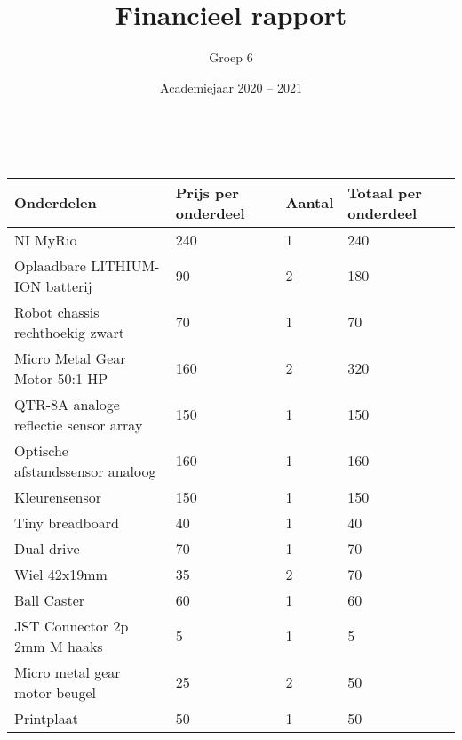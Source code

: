 \documentclass[a4paper,kulak]{kulakarticle} %
\date{Academiejaar 2020 -- 2021}
\title{Financieel rapport}
\author{Groep 6}
\begin{document}

\maketitle


~\\

	\begin{tabular}{|l|l|l|l|}
		\hline
		\textbf{Onderdelen}                   & \textbf{Prijs per onderdeel} & \textbf{Aantal} & \textbf{Totaal per onderdeel} \\ \hline
		NI MyRio                              & 240                          & 1               & 240                           \\ \hline
		Oplaadbare LITHIUM-ION batterij       & 90                           & 2               & 180                           \\ \hline
		Robot chassis rechthoekig zwart       & 70                           & 1               & 70                            \\ \hline
		Micro Metal Gear Motor 50:1 HP        & 160                          & 2               & 320                           \\ \hline
		QTR-8A analoge reflectie sensor array & 150                          & 1               & 150                           \\ \hline
		Optische afstandssensor analoog       & 160                          & 1               & 160                           \\ \hline
		Kleurensensor                         & 150                          & 1               & 150                           \\ \hline
		Tiny breadboard                       & 40                           & 1               & 40                            \\ \hline
		Dual drive                            & 70                           & 1               & 70                            \\ \hline
		Wiel 42x19mm                          & 35                           & 2               & 70                            \\ \hline
		Ball Caster                           & 60                           & 1               & 60                            \\ \hline
		JST Connector 2p 2mm M haaks          & 5                            & 1               & 5                             \\ \hline
		Micro metal gear motor beugel         & 25                           & 2               & 50                            \\ \hline
		Printplaat                            & 50                           & 1               & 50                            \\ \hline
	\end{tabular}
\end{document}

